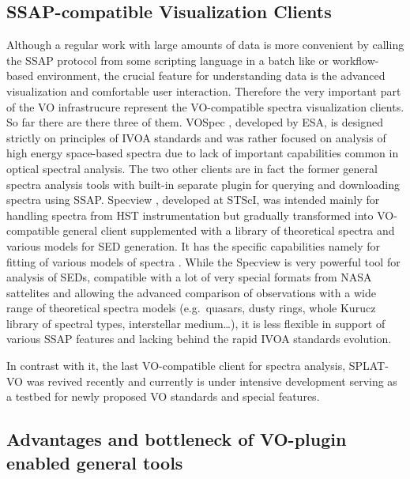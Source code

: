 \documentclass[final,authoryear,5p,times,twocolumn]{elsarticle}
\begin{document}
\subsection{SSAP-compatible  Visualization Clients}


Although a regular work with large amounts of data is more convenient
by calling the SSAP protocol from some scripting language in a batch
like or workflow-based environment, the crucial feature for
understanding data is the advanced visualization and comfortable user
interaction.  Therefore the very important part of the VO
infrastrucure represent the VO-compatible spectra visualization
clients.  So far there are there three of them.  VOSpec
\citep[][]{2005ASPC..347..198O}, developed by ESA, is
designed strictly on principles of IVOA standards and was rather
focused on analysis of high energy space-based spectra due to lack of
important capabilities common in optical spectral analysis.  The two
other clients are in fact the former general spectra analysis tools
with built-in separate plugin for querying and downloading spectra
using SSAP.  Specview \citep[][]{2002SPIE.4847..410B},
developed at STScI, was intended mainly for handling spectra from HST
instrumentation but gradually transformed into VO-compatible general
client supplemented with a library of theoretical spectra and various
models for SED generation.  It has the specific capabilities namely
for fitting of various models of spectra . While the Specview is very
powerful tool for analysis of SEDs, compatible with a lot of very
special formats from NASA sattelites and allowing the advanced
comparison of observations with a wide range of theoretical spectra
models (e.g.\ quasars, dusty rings, whole Kurucz library of spectral
types, interstellar medium\ldots), it is less flexible in support of
various SSAP features and lacking behind the rapid IVOA standards
evolution.

In contrast with it, the last VO-compatible client for spectra
analysis, SPLAT-VO \citep[][]{sun243} was revived
recently and currently is under intensive development serving as a
testbed for newly proposed VO standards and special features.





\subsection{Advantages and bottleneck of  VO-plugin enabled general tools}
\end{document}
